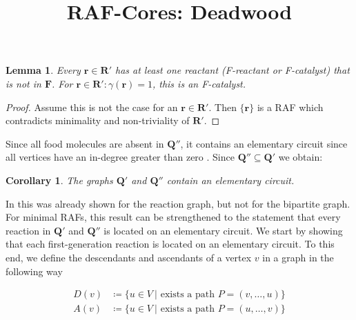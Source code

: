 \documentclass[pdflatex]{sn-jnl}
\theoremstyle{thmstyleone}%
\newtheorem{corollary}[theorem]{Corollary}%
\newtheorem{lemma}[theorem]{Lemma}%
\theoremstyle{examplesty}%
\theoremstyle{thmstylethree}%
\newcommand{\queen}{\mathbf{Q}}
\newcommand{\food}{\ensuremath{\mathbf{F}}}
\newcommand{\fr}[0]{\mathbf{r}}
\newcommand{\RAF}[0]{\mathbf{R}'}
\newcommand{\rgen}{\gamma}
\begin{document}
\title{RAF-Cores: Deadwood} 


\maketitle


\vspace{6pt}
\begin{lemma}
	Every $\fr\in \RAF$ has at least one reactant (F-reactant or F-catalyst) that is not in $\food$. For 
	$\fr\in \RAF: \rgen(\fr)=1$, this is an F-catalyst.
\end{lemma}
\begin{proof}
	 Assume this is not the case for an $\fr\in \RAF$. Then $\{\fr\}$ is a RAF which contradicts minimality
	 and non-triviality of $\RAF$.
\end{proof}

Since all food molecules are absent in $\queen''$, it contains an elementary circuit since all vertices have an 
in-degree greater than zero \cite{bang-jensen_digraphs_2002}. Since $\queen''\subseteq \queen'$ we obtain:
\vspace{6pt}
\begin{corollary}
	The graphs $\queen'$ and $\queen''$ contain an elementary circuit. 
\end{corollary}
\vspace{6pt}

In \cite{steel_minimal_2013} this was already shown for the reaction graph, but not for the bipartite graph. For minimal RAFs, this result 
can be strengthened to the statement that every reaction in $\queen'$ and $\queen''$ is located on an elementary circuit. We start by 
showing that each first-generation reaction is located on an elementary circuit. To this end, we define the descendants and ascendants 
of a vertex $v$ in a graph in the following way

\begin{equation}
	\begin{split}
		D(v) & \coloneqq \{u \in V \ | \text{ exists a path } P=(v,\ldots, u)  \} \\
		A(v) & \coloneqq \{u \in V \ | \text{ exists a path } P=(u,\ldots, v)  \} \\
	\end{split}
\end{equation}
\end{document}
